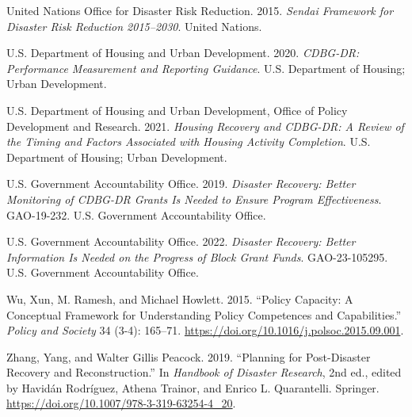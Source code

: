 \documentclass[
  12pt,
  letterpaper,
]{article}
\newlength{\cslhangindent}
\newenvironment{CSLReferences}[2] %
 {\begin{list}{}{%
  \setlength{\itemindent}{0pt}
  \setlength{\leftmargin}{0pt}
  \setlength{\parsep}{0pt}
  \ifodd #1
   \setlength{\leftmargin}{\cslhangindent}
   \setlength{\itemindent}{-1\cslhangindent}
  \fi
  \setlength{\itemsep}{#2\baselineskip}}}
 {\end{list}}
\begin{document}
\begin{CSLReferences}{1}{1}
United Nations Office for Disaster Risk Reduction. 2015. \emph{Sendai
Framework for Disaster Risk Reduction 2015--2030}. United Nations.

U.S. Department of Housing and Urban Development. 2020. \emph{{CDBG-DR}:
Performance Measurement and Reporting Guidance}. U.S. Department of
Housing; Urban Development.

U.S. Department of Housing and Urban Development, Office of Policy
Development and Research. 2021. \emph{Housing Recovery and {CDBG-DR}: A
Review of the Timing and Factors Associated with Housing Activity
Completion}. U.S. Department of Housing; Urban Development.

U.S. Government Accountability Office. 2019. \emph{Disaster Recovery:
Better Monitoring of {CDBG-DR} Grants Is Needed to Ensure Program
Effectiveness}. GAO-19-232. U.S. Government Accountability Office.

U.S. Government Accountability Office. 2022. \emph{Disaster Recovery:
Better Information Is Needed on the Progress of Block Grant Funds}.
GAO-23-105295. U.S. Government Accountability Office.

Wu, Xun, M. Ramesh, and Michael Howlett. 2015. {``Policy Capacity: A
Conceptual Framework for Understanding Policy Competences and
Capabilities.''} \emph{Policy and Society} 34 (3-4): 165--71.
\url{https://doi.org/10.1016/j.polsoc.2015.09.001}.

Zhang, Yang, and Walter Gillis Peacock. 2019. {``Planning for
Post-Disaster Recovery and Reconstruction.''} In \emph{Handbook of
Disaster Research}, 2nd ed., edited by Havidán Rodríguez, Athena
Trainor, and Enrico L. Quarantelli. Springer.
\url{https://doi.org/10.1007/978-3-319-63254-4_20}.

\end{CSLReferences}
\end{document}
